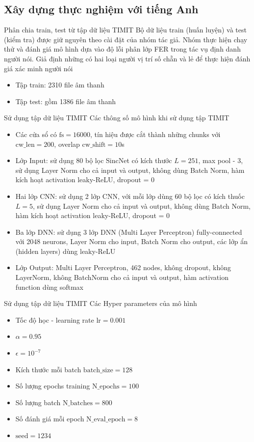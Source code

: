 \documentclass[notheorems, aspectratio=54]{beamer}
\begin{document}
\subsection{Xây dựng thực nghiệm với \textbf{tiếng Anh}}
\begin{frame}{Phân chia train, test từ tập dữ liệu TIMIT}
	Bộ dữ liệu train (huấn luyện) và test (kiểm tra) được giữ nguyên theo cài đặt của nhóm tác giả. Nhóm thực hiện chạy thử và đánh giá mô hình dựa vào độ lỗi phân lớp FER trong tác vụ định danh người nói. Giả định những có hai loại người vị trí số chẵn và lẻ để thực hiện đánh giá xác minh người nói
	\begin{itemize}
		\item Tập train: 2310 file âm thanh
		\item Tập test: gồm 1386 file âm thanh
	\end{itemize}
\end{frame}
\begin{frame}{Sử dụng tập dữ liệu TIMIT}
	Các thông số mô hình khi sử dụng tập TIMIT
	\begin{itemize}
		\item Các cửa sổ có $\text{fs} = 16000$, tín hiệu được cắt thành những chunks với $\text{cw\_len}=200$, overlap $\text{cw\_shift}=10$s
		\item Lớp Input: sử dụng 80 bộ lọc SincNet có kích thước $L=251$, max pool - 3, sử dụng Layer Norm cho cả input và output, không dùng Batch Norm, hàm kích hoạt activation leaky-ReLU, dropout = 0
		\item Hai lớp CNN: sử dụng 2 lớp CNN, với mỗi lớp dùng 60 bộ lọc có kích thuốc $L=5$, sử dụng Layer Norm cho cả input và output, không dùng Batch Norm, hàm kích hoạt activation leaky-ReLU, dropout = 0
		\item Ba lớp DNN: sử dụng 3 lớp DNN (Multi Layer Perceptron) fully-connected với 2048 neurons, Layer Norm cho input, Batch Norm cho output, các lớp ẩn (hidden layers) dùng leaky-ReLU
		\item Lớp Output: Multi Layer Perceptron, 462 nodes, không dropout, không LayerNorm, không BatchNorm cho cả input và output, hàm activation function dùng softmax 
	\end{itemize}
\end{frame}
\begin{frame}{Sử dụng tập dữ liệu TIMIT}
	Các Hyper parameters của mô hình
	\begin{itemize}
		\item Tốc độ học - learning rate $\text{lr} = 0.001$
		\item $\alpha = 0.95$
		\item $\epsilon = 10^{-7}$
		\item Kích thước mỗi batch $\text{batch\_size}=128$
		\item Số lượng epochs training $\text{N\_epochs}=100$
		\item Số lượng batch $\text{N\_batches}=800$
		\item Số đánh giá mỗi epoch $\text{N\_eval\_epoch}=8$
		\item $\text{seed}=1234$
	\end{itemize}
\end{frame}
\end{document}

